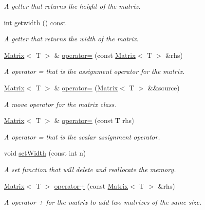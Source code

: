 \begin{DoxyCompactItemize}
\begin{DoxyCompactList}\small\item\em A getter that returns the height of the matrix. \end{DoxyCompactList}\item 
int \hyperlink{classMatrix_a41128ef03cdc83eceb64245a79fe9065}{getwidth} () const 
\begin{DoxyCompactList}\small\item\em A getter that returns the width of the matrix. \end{DoxyCompactList}\item 
\hyperlink{classMatrix}{Matrix}$<$ T $>$ \& \hyperlink{classMatrix_a01990eb2552555d37c83272125be68e6}{operator=} (const \hyperlink{classMatrix}{Matrix}$<$ T $>$ \&rhs)
\begin{DoxyCompactList}\small\item\em A operator = that is the assignment operator for the matrix. \end{DoxyCompactList}\item 
\hyperlink{classMatrix}{Matrix}$<$ T $>$ \& \hyperlink{classMatrix_a8877bee58e9676502b2ed28f72bf3904}{operator=} (\hyperlink{classMatrix}{Matrix}$<$ T $>$ \&\&source)
\begin{DoxyCompactList}\small\item\em A move operator for the matrix class. \end{DoxyCompactList}\item 
\hyperlink{classMatrix}{Matrix}$<$ T $>$ \& \hyperlink{classMatrix_ad00edc48ee35d8e03873e071af20fab5}{operator=} (const T rhs)
\begin{DoxyCompactList}\small\item\em A operator = that is the scalar assignment operator. \end{DoxyCompactList}\item 
void \hyperlink{classMatrix_a855d422aff36db04d2deb6f2e9110e2c}{set\+Width} (const int n)
\begin{DoxyCompactList}\small\item\em A set function that will delete and reallocate the memory. \end{DoxyCompactList}\item 
\hyperlink{classMatrix}{Matrix}$<$ T $>$ \hyperlink{classMatrix_ab2e5abe177a4a5c2abbb3b0602ca6a9d}{operator+} (const \hyperlink{classMatrix}{Matrix}$<$ T $>$ \&rhs)
\begin{DoxyCompactList}\small\item\em A operator + for the matrix to add two matrixes of the same size. \end{DoxyCompactList}\item 

\end{DoxyCompactItemize}
